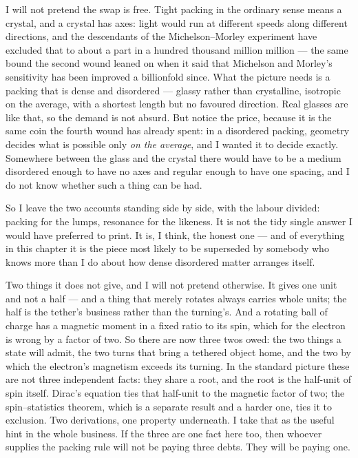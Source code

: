 I will not pretend the swap is free. Tight packing in the ordinary sense means a crystal, and a crystal has axes: light would run at different speeds along different directions, and the descendants of the Michelson--Morley experiment have excluded that to about a part in a hundred thousand million million --- the same bound the second wound leaned on when it said that Michelson and Morley's sensitivity has been improved a billionfold since. What the picture needs is a packing that is dense and disordered --- glassy rather than crystalline, isotropic on the average, with a shortest length but no favoured direction. Real glasses are like that, so the demand is not absurd. But notice the price, because it is the same coin the fourth wound has already spent: in a disordered packing, geometry decides what is possible only \emph{on the average}, and I wanted it to decide exactly. Somewhere between the glass and the crystal there would have to be a medium disordered enough to have no axes and regular enough to have one spacing, and I do not know whether such a thing can be had.

So I leave the two accounts standing side by side, with the labour divided: packing for the lumps, resonance for the likeness. It is not the tidy single answer I would have preferred to print. It is, I think, the honest one --- and of everything in this chapter it is the piece most likely to be superseded by somebody who knows more than I do about how dense disordered matter arranges itself.


Two things it does not give, and I will not pretend otherwise. It gives one unit and not a half --- and a thing that merely rotates always carries whole units; the half is the tether's business rather than the turning's. And a rotating ball of charge has a magnetic moment in a fixed ratio to its spin, which for the electron is wrong by a factor of two. So there are now three twos owed: the two things a state will admit, the two turns that bring a tethered object home, and the two by which the electron's magnetism exceeds its turning. In the standard picture these are not three independent facts: they share a root, and the root is the half-unit of spin itself. Dirac's equation ties that half-unit to the magnetic factor of two; the spin--statistics theorem, which is a separate result and a harder one, ties it to exclusion. Two derivations, one property underneath. I take that as the useful hint in the whole business. If the three are one fact here too, then whoever supplies the packing rule will not be paying three debts. They will be paying one.


